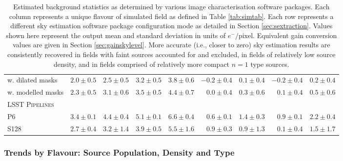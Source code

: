 \documentclass[fleqn,usenatbib,useAMS]{mnras}
\newcommand*{\LSSTPs}{\textsc{LSST Pipelines}\xspace}
\newcommand*{\DMA}{\textsc{P6}\xspace}
\newcommand*{\DMB}{\textsc{S128}\xspace}
\begin{document}
\begin{table*}
\begin{tabular}{ l | r | r | r | r | r | r | r | r }
    \hspace{25pt}w. dilated masks & $2.0\pm0.5$ & $2.5\pm0.5$ & $3.2\pm0.5$ & $3.8\pm0.6$ & $-0.2\pm0.4$ & $0.1\pm0.4$ & $-0.2\pm0.4$ & $0.2\pm0.4$\\
    \hspace{25pt}w. modelled masks & $2.3\pm0.5$ & $3.1\pm0.6$ & $3.5\pm0.5$ & $4.4\pm0.7$ & $0.0\pm0.4$ & $0.3\pm0.6$ & $0.1\pm0.4$ & $0.5\pm0.6$\\
    \hline
    \LSSTPs & & & & & & & & \\
    \hspace{25pt}\DMA & $3.4\pm0.1$ & $4.4\pm0.4$ & $5.1\pm0.1$ & $6.6\pm0.4$ & $0.6\pm0.1$ & $1.4\pm0.3$ & $0.9\pm0.1$ & $2.2\pm0.4$\\
    \hspace{25pt}\DMB & $2.7\pm0.4$ & $3.2\pm1.4$ & $3.9\pm0.5$ & $5.5\pm1.6$ & $0.9\pm0.3$ & $0.9\pm1.3$ & $0.1\pm0.4$ & $1.5\pm1.7$\\
    \end{tabular}
    \caption{Estimated background statistics as determined by various image characterisation software packages. Each column represents a unique flavour of simulated field as defined in Table \ref{tab:simtab}. Each row represents a different sky estimation software package configuration mode as detailed in Section \ref{sec:sextraction}. Values shown here represent the output mean and standard deviation in units of $e^{-}/\textrm{pixel}$. Equivalent gain conversion values are given in Section \ref{sec:gainskylevel}. More accurate (i.e., closer to zero) sky estimation results are consistently recovered in fields with faint sources accounted for and excluded, in fields of relatively low source density, and in fields comprised of relatively more compact $n=1$ type sources.}
    \label{tab:results}
\end{table*}

\subsubsection{Trends by Flavour: Source Population, Density and Type}
\label{sec:flavour}
\end{document}
